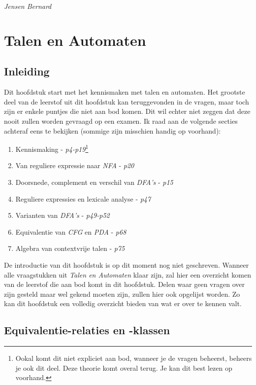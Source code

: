 \documentclass[10pt,a4paper]{article}
\begin{document}
\hfill \emph{Jensen Bernard}

\newpage
\clearpage
{}

\section{Talen en Automaten}

\subsection{Inleiding}

	Dit hoofdstuk start met het kennismaken met talen en automaten. Het grootste deel van de leerstof uit dit hoofdstuk kan teruggevonden in de vragen, maar toch zijn er enkele puntjes die niet aan bod komen. Dit wil echter niet zeggen dat deze nooit zullen worden gevraagd op een examen. Ik raad aan de volgende secties achteraf eens te bekijken (sommige zijn misschien handig op voorhand):
	\begin{enumerate}
		\item Kennismaking - \emph{p4-p19}\footnote{Ookal komt dit niet expliciet aan bod, wanneer je de vragen beheerst, beheers je ook dit deel. Deze theorie komt overal terug. Je kan dit best lezen op voorhand.}
		\item Van reguliere expressie naar \emph{NFA} - \emph{p20}
		\item Doorsnede, complement en verschil van \emph{DFA's} - \emph{p15}
		\item Reguliere expressies en lexicale analyse - \emph{p47}
		\item Varianten van \emph{DFA's} - \emph{p49-p52}
		\item Equivalentie van \emph{CFG} en \emph{PDA} - \emph{p68}
		\item Algebra van contextvrije talen - \emph{p75}
	\end{enumerate}

	De introductie van dit hoofdstuk is op dit moment nog niet geschreven. Wanneer alle vraagstukken uit \emph{Talen en Automaten} klaar zijn, zal hier een overzicht komen van de leerstof die aan bod komt in dit hoofdstuk. Delen waar geen vragen over zijn gesteld maar wel gekend moeten zijn, zullen hier ook opgelijst worden. Zo kan dit hoofdstuk een volledig overzicht bieden van wat er over te kennen valt.

\subsection{Equivalentie-relaties en -klassen}
\end{document}
